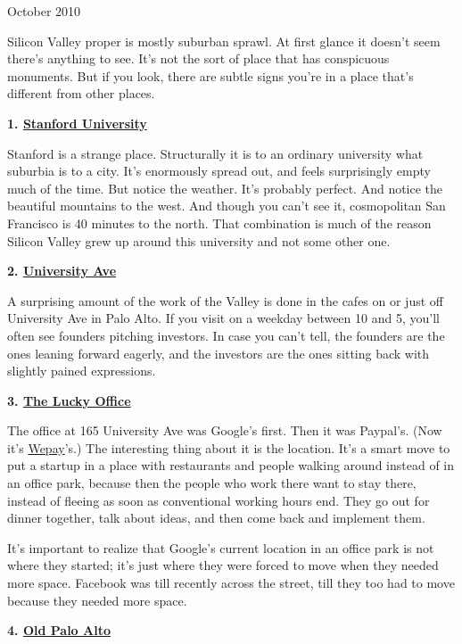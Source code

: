 October 2010

Silicon Valley proper is mostly suburban sprawl. At first glance it
doesn't seem there's anything to see. It's not the sort of place that
has conspicuous monuments. But if you look, there are subtle signs
you're in a place that's different from other places.

\textbf{1.
\href{http://maps.google.com/maps?q=stanford+university}{Stanford
University}}

Stanford is a strange place. Structurally it is to an ordinary
university what suburbia is to a city. It's enormously spread out, and
feels surprisingly empty much of the time. But notice the weather. It's
probably perfect. And notice the beautiful mountains to the west. And
though you can't see it, cosmopolitan San Francisco is 40 minutes to the
north. That combination is much of the reason Silicon Valley grew up
around this university and not some other one.

\textbf{2.
\href{http://maps.google.com/maps?q=university+and+ramona+palo+alto}{University
Ave}}

A surprising amount of the work of the Valley is done in the cafes on or
just off University Ave in Palo Alto. If you visit on a weekday between
10 and 5, you'll often see founders pitching investors. In case you
can't tell, the founders are the ones leaning forward eagerly, and the
investors are the ones sitting back with slightly pained expressions.

\textbf{3.
\href{http://maps.google.com/maps?q=165+university+ave+palo+alto}{The
Lucky Office}}

The office at 165 University Ave was Google's first. Then it was
Paypal's. (Now it's \href{http://wepay.com}{Wepay}'s.) The interesting
thing about it is the location. It's a smart move to put a startup in a
place with restaurants and people walking around instead of in an office
park, because then the people who work there want to stay there, instead
of fleeing as soon as conventional working hours end. They go out for
dinner together, talk about ideas, and then come back and implement
them.

It's important to realize that Google's current location in an office
park is not where they started; it's just where they were forced to move
when they needed more space. Facebook was till recently across the
street, till they too had to move because they needed more space.

\textbf{4. \href{http://maps.google.com/maps?q=old+palo+alto}{Old Palo
Alto}}

